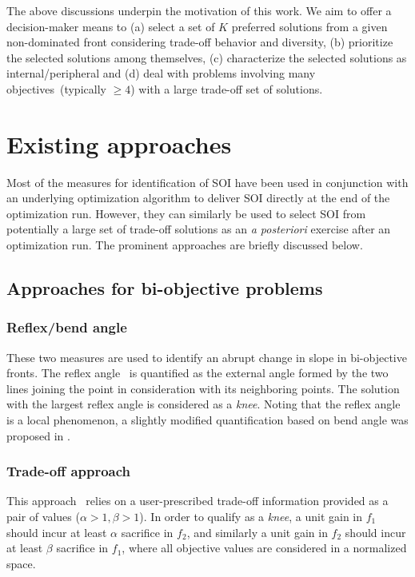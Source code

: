 The above discussions underpin the motivation of this work. We aim to offer a decision-maker means to (a) select a set of $K$ preferred solutions from a given non-dominated front considering trade-off behavior and diversity, (b) prioritize the selected solutions among themselves, (c) characterize the selected solutions as internal/peripheral and (d) deal with problems involving many objectives~(typically $\geq 4$) with a large trade-off set of solutions.    

\section{Existing approaches}
\label{sec:soi}
Most of the measures for identification of SOI have been used in conjunction with an underlying optimization algorithm to deliver SOI directly at the end of the optimization run. However, they can similarly be used to select SOI from potentially a large set of trade-off solutions as an \textit{a posteriori} exercise after an optimization run. The prominent approaches are briefly discussed below. 

\subsection{Approaches for bi-objective problems}

\subsubsection{Reflex/bend angle} These two measures are used to identify an abrupt change in slope in bi-objective fronts. The reflex angle~\cite{branke2004finding} is quantified as the external angle formed by the two lines joining the point in consideration with its neighboring points. The solution with the largest reflex angle is considered as a \textit{knee}. Noting that the reflex angle is a local phenomenon, a slightly modified quantification based on bend angle was proposed in \cite{deb2011understanding}. 

\subsubsection{Trade-off approach} This approach~\cite{deb2011understanding} relies on a user-prescribed trade-off information provided as a pair of values ($\alpha>1,\beta>1$). In order to qualify as a \textit{knee}, a unit gain in $f_1$ should incur at least $\alpha$ sacrifice in $f_2$, and similarly a unit gain in $f_2$ should incur at least $\beta$ sacrifice in $f_1$, where all objective values are considered in a normalized space. 

